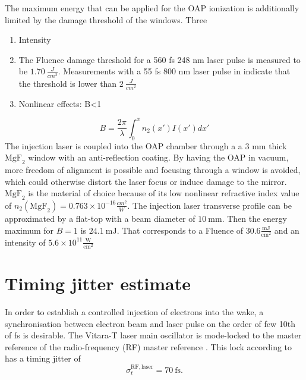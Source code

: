 The maximum energy that can be applied for the OAP ionization is additionally limited by the damage threshold of the windows.  Three 
\begin{enumerate}
\item Intensity
\item The Fluence damage threshold for a 560 fs 248 nm laser pulse is measured \cite{mann1993damage} to be $1.70\ \frac{J}{cm^2}$. Measurements with a 55 fs 800 nm laser pulse in \cite{LiMgF2DamageThresh} indicate that the threshold is lower than $2\ \frac{J}{cm^2}$
\item Nonlinear effects: B<1
\end{enumerate}
\begin{equation}
B=\frac{2\pi}{\lambda}\int_0^{x}n_2(x')I(x')dx'
\end{equation}
The injection laser is coupled into the OAP chamber through a 
a 3 mm thick $\mathrm{MgF}_2$ window with an anti-reflection coating. By having the OAP in vacuum, more freedom of alignment is possible and focusing through a window is avoided, which could otherwise distort the laser focus or induce damage to the mirror.
$\mathrm{MgF}_2$ is the material of choice because of its low nonlinear refractive index value of  $n_2(\mathrm{MgF}_2)=0.763\times 10^{-16}\frac{cm^2}{W}$\cite{Nonlin_refr_index_PRB1989}.
The injection laser transverse profile can be approximated by a flat-top with a beam diameter of $10\ \mathrm{mm}$. 
Then the energy maximum for $B=1$ is $24.1\ \mathrm{mJ}$. That corresponds to a Fluence of $30.6 \frac{\mathrm{mJ}}{\mathrm{cm}^2}$ and an intensity of $5.6\times 10^{11}\frac{\mathrm{W}}{\mathrm{cm}^2}$


\section*{Timing jitter estimate}
In order to establish a controlled injection of electrons into the wake, a synchronisation between electron beam and laser pulse on the order of few 10th of fs is desirable. 
The Vitara-T laser main oscillator is mode-locked to the master reference of the radio-frequency (RF) master reference \cite{Green_FACET_Laser_PIOP}. This lock according to \cite{Green_FACET_Laser_PIOP} has a timing jitter of 
\begin{equation}
\sigma_{t}^\mathrm{RF,laser}=70\ \mathrm{fs}.
\end{equation}

